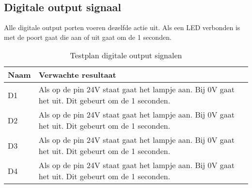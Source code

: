 \newpage
\subsection{Digitale output signaal} 
Alle digitale output porten voeren dezelfde actie uit. Als een LED verbonden is met de poort gaat die aan of uit gaat om de 1 seconden.
\begin{table}[h!]
	\caption{Testplan digitale output signalen}
	\begin{tabular}{lp{14.5cm}}
	\toprule
	\textbf{Naam} 	& \textbf{Verwachte resultaat} \\ \toprule
	D1	&	Als op de pin 24V staat gaat het lampje aan. Bij 0V gaat het uit. Dit gebeurt om de 1 seconden. \\
	D2	&	Als op de pin 24V staat gaat het lampje aan. Bij 0V gaat het uit. Dit gebeurt om de 1 seconden. \\
	D3	&	Als op de pin 24V staat gaat het lampje aan. Bij 0V gaat het uit. Dit gebeurt om de 1 seconden. \\
	D4	&	Als op de pin 24V staat gaat het lampje aan. Bij 0V gaat het uit. Dit gebeurt om de 1 seconden. \\ \bottomrule
	\end{tabular}
	\label{tab:hw_val_dio_testplan}
\end{table}

